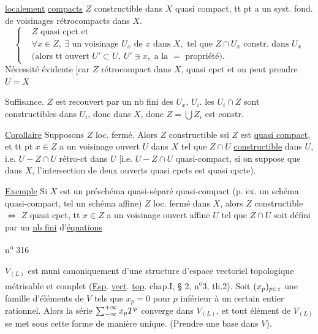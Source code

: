 \uline{ localement} \uline{compacts}
$Z$ constructible dans $X$ quasi compact,  tt pt a un syst. fond. de voisinages rétrocompacts dans $X$.
\[
\left\{\begin{aligned}
&Z\text{ quasi cpct et}\\
&\forall x\in Z,\ \exists\text{ un voisinage }U_x\text{ de }x\text{ dans }X,\text{ tel que }Z\cap U_x\text{ constr. dans }U_x\\
&\text{(alors tt ouvert }U'\subset U,\ U'\ni x,\text{ a la }=\text{ propriété)}.
\end{aligned}\right.
\]
Nécessité évidente [car $Z$ rétrocompact dans $X$,  quasi cpct et on peut prendre $U=X$

Suffisance. $Z$ est recouvert par un nb fini des $U_x$,  $U_i$. les $U_i\cap Z$ sont constructibles dans $U_i$, donc dans $X$, donc $Z=\bigcup Z_i$ est constr.

\uline{Corollaire} Supposons $Z$ loc. fermé. Alors $Z$  constructible ssi $Z$ est \uline{quasi compact}, et tt pt $x\in Z$ a un voisinage ouvert $U$ dans $X$ tel que $Z\cap U$   \uline{constructible} dans $U$, i.e. $U-Z\cap U$ rétro-ct dans $U$ [i.e. $U-Z\cap U$ quasi-compact, si on  suppose que dans $X$, l'intersection de deux ouverts quasi cpcts est quasi cpcte).

\uline{Exemple} Si $X$ est un préschéma quasi-séparé quasi-compact (p. ex. un schéma quasi-compact, tel un schéma affine)  $Z$ loc. fermé dans $X$, alors $Z$ constructible $\Longleftrightarrow$ $Z$ quasi cpct,  tt $x\in Z$ a un voisinage ouvert affine $U$ tel que $Z\cap U$ soit défini par un \uline{nb fini} d'\uline{équations}

n\textsuperscript{o} 316

$V_{(L)}$ est muni canoniquement d'une structure d'espace vectoriel topologique métrisable et complet (\uline{Esp}. \uline{vect}. \uline{top}. chap.I, § 2, n\textsuperscript{o}3, th.2).
Soit $(x_p)_{p\in z}$ une famille d'éléments de $V$ tels que $x_p=0$ pour $p$ inférieur à un certain entier rationnel. Alors la série $\mathop{\sum}\nolimits_{-\infty}^{+\infty}x_p T^p$ converge dans $V_{(L)}$, et tout élément de $V_{(L)}$ se met sous cette forme de manière unique. (Prendre une base dans $V$).

